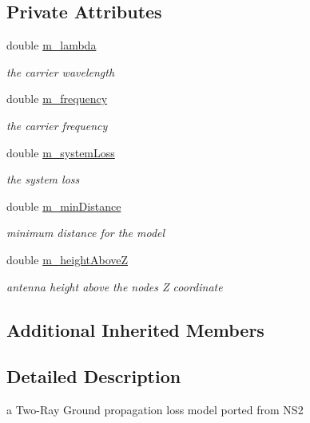 \subsection*{Private Attributes}
\begin{DoxyCompactItemize}
\item 
double \hyperlink{classns3_1_1TwoRayGroundPropagationLossModel_af726ad6c9f16a5bd5d99db02be47fd78}{m\+\_\+lambda}
\begin{DoxyCompactList}\small\item\em the carrier wavelength \end{DoxyCompactList}\item 
double \hyperlink{classns3_1_1TwoRayGroundPropagationLossModel_ae83dd1e9c0cccc220a3f04b81194221a}{m\+\_\+frequency}
\begin{DoxyCompactList}\small\item\em the carrier frequency \end{DoxyCompactList}\item 
double \hyperlink{classns3_1_1TwoRayGroundPropagationLossModel_a944fc5bdc91fb21e200374a5f415d826}{m\+\_\+system\+Loss}
\begin{DoxyCompactList}\small\item\em the system loss \end{DoxyCompactList}\item 
double \hyperlink{classns3_1_1TwoRayGroundPropagationLossModel_a2afd2fcfb186242e2fe2d6ef85240498}{m\+\_\+min\+Distance}
\begin{DoxyCompactList}\small\item\em minimum distance for the model \end{DoxyCompactList}\item 
double \hyperlink{classns3_1_1TwoRayGroundPropagationLossModel_a3b383aac3f7bf082f1bb15ca6b1efd3f}{m\+\_\+height\+AboveZ}
\begin{DoxyCompactList}\small\item\em antenna height above the node\textquotesingle{}s Z coordinate \end{DoxyCompactList}\end{DoxyCompactItemize}
\subsection*{Additional Inherited Members}


\subsection{Detailed Description}
a Two-\/\+Ray Ground propagation loss model ported from N\+S2 

